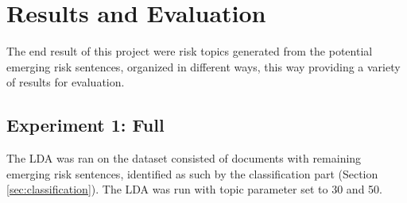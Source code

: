 \chapter{Results and Evaluation}
The end result of this project were risk topics generated from the potential emerging risk sentences, organized in different ways, this way providing a variety of results for evaluation.

\section{Experiment 1: Full}
The LDA was ran on the dataset consisted of documents with remaining emerging risk sentences, identified as such by the classification part (Section \ref{sec:classification}). The LDA was run with topic parameter set to 30 and 50.

